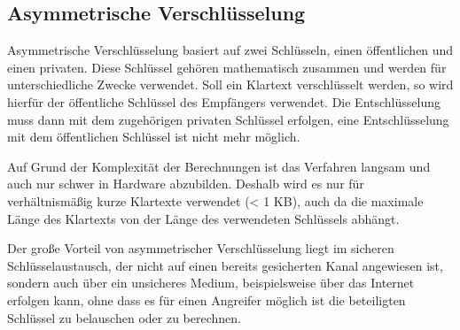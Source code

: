 \subsection{Asymmetrische Verschlüsselung}
\label{sec:asym_verschl}


Asymmetrische Verschlüsselung basiert auf zwei Schlüsseln, einen öffentlichen und einen privaten. Diese Schlüssel gehören mathematisch zusammen und werden für unterschiedliche Zwecke verwendet.
Soll ein Klartext verschlüsselt werden, so wird hierfür der öffentliche Schlüssel des Empfängers verwendet. Die Entschlüsselung muss dann mit dem zugehörigen privaten Schlüssel erfolgen, eine Entschlüsselung mit dem öffentlichen Schlüssel ist nicht mehr möglich.

Auf Grund der Komplexität der Berechnungen ist das Verfahren langsam und auch nur schwer in Hardware abzubilden. Deshalb wird es nur für verhältnismäßig kurze Klartexte verwendet (< 1 KB), auch da die maximale Länge des Klartexts von der Länge des verwendeten Schlüssels abhängt. %


Der große Vorteil von asymmetrischer Verschlüsselung liegt im sicheren Schlüsselaustausch, der nicht auf einen bereits gesicherten Kanal angewiesen ist, sondern auch über ein unsicheres Medium, beispielsweise über das Internet erfolgen kann, ohne dass es für einen Angreifer möglich ist die beteiligten Schlüssel zu belauschen oder zu berechnen. %




